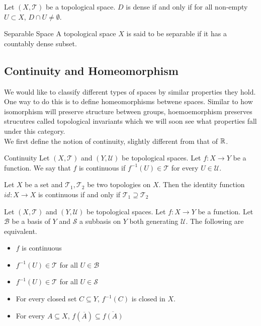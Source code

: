 \documentclass[a4paper]{article}
\begin{document}
\begin{prp}{}{} Let $(X,\mathcal{T})$ be a topological space. $D$ is dense if and only if for all non-empty $U\subset X$, $D\cap U\neq\emptyset$. 
\end{prp}

\begin{defn}{Separable Space}{} A topological space $X$ is said to be separable if it has a countably dense subset. 
\end{defn}

\subsection{Continuity and Homeomorphism}
We would like to classify different types of spaces by similar properties they hold. One way to do this is to define homeomorphisms betwene spaces. Similar to how isomorphism will preserve structure between groups, hoemoemorphism preserves strucutres called topological invariants which we will soon see what properties fall under this category. \\
We first define the notion of continuity, slightly different from that of $\mathbb{R}$. 
\begin{defn}{Continuity}{} Let $(X,\mathcal{T})$ and $(Y,\mathcal{U})$ be topological spaces. Let $f:X\to Y$ be a function. We say that $f$ is continuous if $f^{-1}(U)\in\mathcal{T}$ for every $U\in\mathcal{U}$. 
\end{defn}

\begin{prp}{}{} Let $X$ be a set and $\mathcal{T}_1,\mathcal{T}_2$ be two topologies on $X$. Then the identity function $id:X\to X$ is continuous if and only if $\mathcal{T}_1\supseteq\mathcal{T}_2$
\end{prp}

\begin{prp}{}{} Let $(X,\mathcal{T})$ and $(Y,\mathcal{U})$ be topological spaces. Let $f:X\to Y$ be a function. Let $\mathcal{B}$ be a basis of $Y$ and $\mathcal{S}$ a subbasis on $Y$ both generating $\mathcal{U}$. The following are equivalent. 
\begin{itemize}
\item $f$ is continuous
\item $f^{-1}(U)\in\mathcal{T}$ for all $U\in\mathcal{B}$
\item $f^{-1}(U)\in\mathcal{T}$ for all $U\in\mathcal{S}$
\item For every closed set $C\subseteq Y$, $f^{-1}(C)$ is closed in $X$. 
\item For every $A\subseteq X$, $f(\overline{A})\subseteq\overline{f(A)}$
\end{itemize}
\end{prp}
\end{document}
